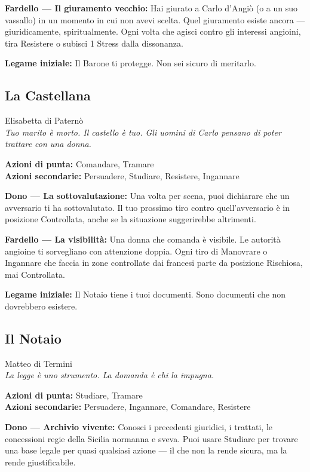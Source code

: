\textbf{Fardello — Il giuramento vecchio:} Hai giurato a Carlo
d'Angiò (o a un suo vassallo) in un momento in cui non avevi
scelta. Quel giuramento esiste ancora — giuridicamente, spiritualmente.
Ogni volta che agisci contro gli interessi angioini, tira Resistere
o subisci 1 Stress dalla dissonanza.

\textbf{Legame iniziale:} Il Barone ti protegge. Non sei sicuro
di meritarlo.

\filetto

\subsection{La Castellana}
{\cinzel\footnotesize\color{grigionote} Elisabetta di Paternò}\\
\textit{Tuo marito è morto. Il castello è tuo. Gli uomini di Carlo
pensano di poter trattare con una donna.}

\textbf{Azioni di punta:} Comandare, Tramare\\
\textbf{Azioni secondarie:} Persuadere, Studiare, Resistere, Ingannare

\textbf{Dono — La sottovalutazione:} Una volta per scena, puoi
dichiarare che un avversario ti ha sottovalutato. Il tuo prossimo
tiro contro quell'avversario è in posizione Controllata, anche se
la situazione suggerirebbe altrimenti.

\textbf{Fardello — La visibilità:} Una donna che comanda è visibile.
Le autorità angioine ti sorvegliano con attenzione doppia. Ogni
tiro di Manovrare o Ingannare che faccia in zone controllate dai
francesi parte da posizione Rischiosa, mai Controllata.

\textbf{Legame iniziale:} Il Notaio tiene i tuoi documenti. Sono
documenti che non dovrebbero esistere.

\filetto

\subsection{Il Notaio}
{\cinzel\footnotesize\color{grigionote} Matteo di Termini}\\
\textit{La legge è uno strumento. La domanda è chi la impugna.}

\textbf{Azioni di punta:} Studiare, Tramare\\
\textbf{Azioni secondarie:} Persuadere, Ingannare, Comandare, Resistere

\textbf{Dono — Archivio vivente:} Conosci i precedenti giuridici,
i trattati, le concessioni regie della Sicilia normanna e sveva.
Puoi usare Studiare per trovare una base legale per quasi qualsiasi
azione — il che non la rende sicura, ma la rende giustificabile.

